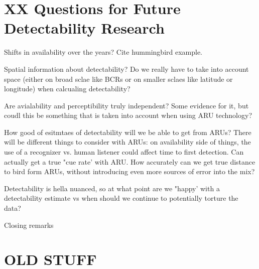 \section{XX Questions for Future Detectability Research}

Shifts in availability over the years? Cite hummingbird example.

Spatial information about detectability? Do we really have to take into account space (either on broad sclae like BCRs or on smaller sclaes like latitude or longitude) when calcualing detectability?

Are avialability and perceptibility truly independent? Some evidence for it, but coudl this be something that is taken into account when using ARU technology?

How good of esitmtaes of detectability will we be able to get from ARUs? There will be different things to consider with ARUs: on availability side of things, the use of a recognizer vs. human listener could affect time to first detection. Can actually get a true "cue rate' with ARU. How accurately can we get true distance to bird form ARUs, without introducing even more sources of error into the mix?

Detectability is hella nuanced, so at what point are we "happy' with a detectability estimate vs when should we continue to potentially torture the data?

Closing remarks 

\section{OLD STUFF }

